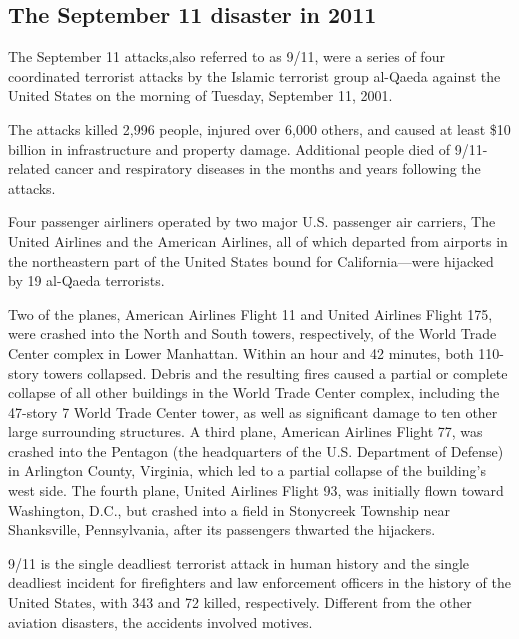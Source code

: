 \documentclass[a4paper,10pt]{article}
\begin{document}
\subsection{The September 11 disaster in 2011}
The September 11 attacks,also referred to as 9/11, were a series of four coordinated terrorist attacks by the Islamic terrorist group al-Qaeda against the United States on the morning of Tuesday, 
September 11, 2001. 

The attacks killed 2,996 people, injured over 6,000 others, and caused at least \$10 billion in infrastructure and property damage. 
Additional people died of 9/11-related cancer and respiratory diseases in the months and years following the attacks. \par
Four passenger airliners operated by two major U.S. passenger air carriers, The United Airlines and the American Airlines, all of which departed from airports in the northeastern 
part of the United States bound for California—were hijacked by 19 al-Qaeda terrorists. 

Two of the planes, American Airlines Flight 11 and United Airlines Flight 175, were crashed into the North and South towers, respectively, of the World Trade Center complex in Lower Manhattan. Within an hour and 42 minutes, both 110-story towers collapsed. Debris and the resulting fires caused a partial or complete collapse of all other buildings in the World Trade Center complex, including the 47-story 7 World Trade Center tower, as well as significant damage to ten other large surrounding structures. A third plane, American Airlines Flight 77, was crashed into the Pentagon (the headquarters of the U.S. Department of Defense) in Arlington County, Virginia, which led to a partial collapse of the building's west side. The fourth plane, United Airlines Flight 93, was initially flown toward Washington, D.C., but crashed into a field in Stonycreek Township near Shanksville, Pennsylvania, after its passengers thwarted the hijackers.\par

9/11 is the single deadliest terrorist attack in human history and the single deadliest incident for firefighters and law enforcement officers in the history of the United States, with 343 and 72 killed, respectively. Different from the other aviation disasters, the accidents involved motives. \par
\end{document}

